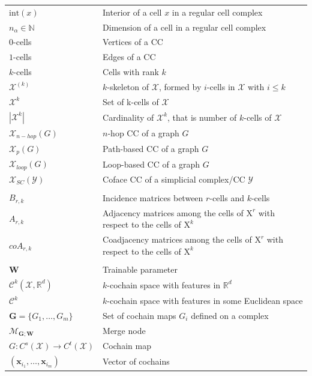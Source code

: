 \documentclass[
  12pt,
]{krantz}
\begin{document}
\begin{longtable}[]{@{}
  >{\raggedright\arraybackslash}p{}
  >{\raggedright\arraybackslash}p{}@{}}
\(\mbox{int}(x)\) & Interior of a cell \(x\) in a regular cell
complex \\
\(n_\alpha\in \mathbb{N}\) & Dimension of a cell in a regular cell
complex \\
\(0\)-cells & Vertices of a CC \\
\(1\)-cells & Edges of a CC \\
\(k\)-cells & Cells with rank \(k\) \\
\(\mathcal{X}^{(k)}\) & \(k\)-skeleton of \(\mathcal{X}\), formed by
\(i\)-cells in \(\mathcal{X}\) with \(i\leq k\) \\
\(\mathcal{X}^k\) & Set of k-cells of \(\mathcal{X}\) \\
\(|\mathcal{X}^k|\) & Cardinality of \(\mathcal{X}^k\), that is number
of \(k\)-cells of \(\mathcal{X}\) \\
\(\mathcal{X}_{n-hop}(G)\) & \(n\)-hop CC of a graph \(G\) \\
\(\mathcal{X}_p(G)\) & Path-based CC of a graph \(G\) \\
\(\mathcal{X}_{loop}(G)\) & Loop-based CC of a graph \(G\) \\
\(\mathcal{X}_{SC}(\mathcal{Y})\) & Coface CC of a simplicial complex/CC
\(\mathcal{Y}\) \\
& \\
\(B_{r,k}\) & Incidence matrices between \(r\)-cells and \(k\)-cells \\
\(A_{r,k}\) & Adjacency matrices among the cells of \(\mbox{X}^{r}\)
with respect to the cells of \(\mbox{X}^{k}\) \\
\(coA_{r,k}\) & Coadjacency matrices among the cells of \(\mbox{X}^{r}\)
with respect to the cells of \(\mbox{X}^{k}\) \\
& \\
\(\mathbf{W}\) & Trainable parameter \\
\(\mathcal{C}^k(\mathcal{X},\mathbb{R}^d)\) & \(k\)-cochain space with
features in \(\mathbb{R}^d\) \\
\(\mathcal{C}^k\) & \(k\)-cochain space with features in some Euclidean
space \\
\(\mathbf{G}= \{G_1,\ldots,G_m\}\) & Set of cochain maps \(G_i\) defined
on a complex \\
\(\mathcal{M}_{ \mathbf{G};\mathbf{W}}\) & Merge node \\
\(G:C^{s}(\mathcal{X})\to C^{t}(\mathcal{X})\) & Cochain map \\
\((\mathbf{x}_{i_1},\ldots, \mathbf{x}_{i_m})\) & Vector of cochains \\

\end{longtable}
\end{document}
